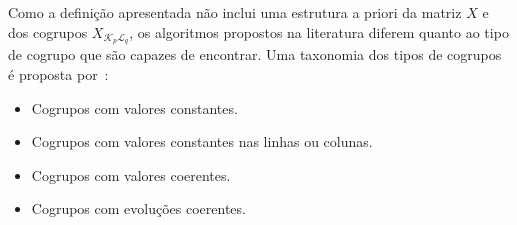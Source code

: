 \documentclass[
    12pt,                %
    oneside,            %
    a4paper,            %
    english,            %
    brazil                %
    ]{abntex2ppgsi}
\begin{document}
Como a definição apresentada não inclui uma estrutura a priori da matriz $X$ e dos cogrupos $X_{\mathcal{K}_p \mathcal{L}_q}$, os algoritmos propostos na literatura diferem quanto ao tipo de cogrupo que são capazes de encontrar.
Uma taxonomia dos tipos de cogrupos é proposta por~:
 \begin{itemize}
    \item Cogrupos com valores constantes.
    \item Cogrupos com valores constantes nas linhas ou colunas.
    \item Cogrupos com valores coerentes.
    \item Cogrupos com evoluções coerentes.
 \end{itemize}
\end{document}
